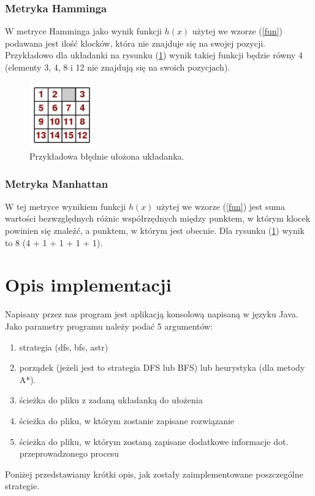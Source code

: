 \documentclass{classrep}
\begin{document}
\subsubsection{Metryka Hamminga} %
W metryce Hamminga jako wynik funkcji $h(x)$ użytej we wzorze (\ref{fun}) podawana jest ilość klocków, która nie znajduje się na swojej pozycji. Przykładowo dla układanki na rysunku (\ref{blednaukladanka}) wynik takiej funkcji będzie równy 4 (elementy 3, 4, 8 i 12 nie znajdują się na swoich pozycjach).
\begin{figure}[h!]
    \centering
    \includegraphics[width=0.25\textwidth]{15wrong1.jpg}
    \caption{Przykładowa błędnie ułożona układanka.}
	\label{blednaukladanka}
\end{figure}

\subsubsection{Metryka Manhattan}  %
W tej metryce wynikiem funkcji $h(x)$ użytej we wzorze (\ref{fun}) jest suma wartości bezwzględnych różnic współrzędnych między punktem, w którym klocek powinien się znaleźć, a punktem, w którym jest obecnie. Dla rysunku (\ref{blednaukladanka}) wynik to 8 (4 + 1 + 1 + 1 + 1).

\section{Opis implementacji} %
Napisany przez nas program jest aplikacją konsolową napisaną w języku Java. Jako parametry programu należy podać 5 argumentów:
\begin{enumerate}
\item strategia (dfs, bfs, astr)
\item porządek (jeżeli jest to strategia DFS lub BFS) lub heurystyka (dla metody A*). 
\item ścieżka do pliku z zadaną układanką do ułożenia
\item ścieżka do pliku, w którym zostanie zapisane rozwiązanie
\item ścieżka do pliku, w którym zostaną zapisane dodatkowe informacje dot. przeprowadzonego procesu
\end{enumerate}
Poniżej przedstawiamy krótki opis, jak zostały zaimplementowane poszczególne strategie.
\end{document}
